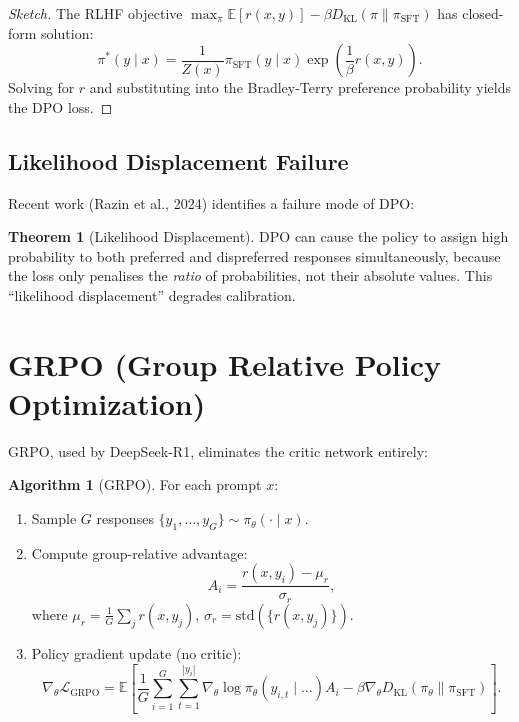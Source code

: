 \documentclass[11pt,a4paper]{book}
\theoremstyle{definition}
\newtheorem{theorem}{Theorem}[chapter]
\newtheorem{algorithm}{Algorithm}[chapter]
\begin{document}
\begin{proof}[Sketch]
	The RLHF objective $\max_{\pi} \mathbb{E}[r(x,y)] - \beta D_{\mathrm{KL}}(\pi \parallel \pi_{\text{SFT}})$ has closed-form solution:
	\begin{equation}
		\pi^*(y \mid x) = \frac{1}{Z(x)} \pi_{\text{SFT}}(y \mid x) \exp\left(\frac{1}{\beta} r(x, y)\right).
	\end{equation}
	Solving for $r$ and substituting into the Bradley-Terry preference probability yields the DPO loss.
\end{proof}

\subsection{Likelihood Displacement Failure}

Recent work (Razin et al., 2024) identifies a failure mode of DPO:

\begin{theorem}[Likelihood Displacement]
	DPO can cause the policy to assign high probability to both preferred and dispreferred responses simultaneously, because the loss only penalises the \emph{ratio} of probabilities, not their absolute values. This ``likelihood displacement'' degrades calibration.
\end{theorem}

\section{GRPO (Group Relative Policy Optimization)}

GRPO, used by DeepSeek-R1, eliminates the critic network entirely:

\begin{algorithm}[GRPO]
	For each prompt $x$:
	\begin{enumerate}
		\item Sample $G$ responses $\{y_1, \dots, y_G\} \sim \pi_\theta(\cdot \mid x)$.
		\item Compute group-relative advantage:
		      \begin{equation}
			      A_i = \frac{r(x, y_i) - \mu_r}{\sigma_r},
		      \end{equation}
		      where $\mu_r = \frac{1}{G}\sum_j r(x, y_j)$, $\sigma_r = \text{std}(\{r(x, y_j)\})$.
		\item Policy gradient update (no critic):
		      \begin{equation}
			      \nabla_\theta \mathcal{L}_{\text{GRPO}} = \mathbb{E}\left[ \frac{1}{G}\sum_{i=1}^G \sum_{t=1}^{|y_i|} \nabla_\theta \log \pi_\theta(y_{i,t} \mid \dots) A_i - \beta \nabla_\theta D_{\mathrm{KL}}(\pi_\theta \parallel \pi_{\text{SFT}}) \right].
		      \end{equation}
	\end{enumerate}
\end{algorithm}
\end{document}
